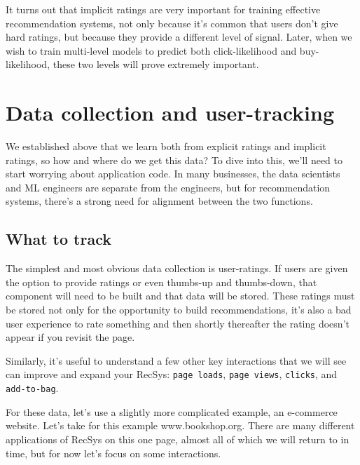 It turns out that implicit ratings are very important for training effective recommendation systems, not only because it's common that users don't give hard ratings, but because they provide a different level of signal. Later, when we wish to train multi-level models to predict both click-likelihood and buy-likelihood, these two levels will prove extremely important.

\section{Data collection and user-tracking}

We established above that we learn both from explicit ratings and implicit ratings, so how and where do we get this data? To dive into this, we'll need to start worrying about application code. In many businesses, the data scientists and ML engineers are separate from the engineers, but for recommendation systems, there's a strong need for alignment between the two functions.

\subsection{What to track}

The simplest and most obvious data collection is user-ratings. If users are given the option to provide ratings or even thumbs-up and thumbs-down, that component will need to be built and that data will be stored. These ratings must be stored not only for the opportunity to build recommendations, it's also a bad user experience to rate something and then shortly thereafter the rating doesn't appear if you revisit the page.

Similarly, it's useful to understand a few other key interactions that we will see can improve and expand your RecSys: \lstinline{page loads}, \lstinline{page views}, \lstinline{clicks}, and \lstinline{add-to-bag}.

For these data, let's use a slightly more complicated example, an e-commerce website. Let's take for this example www.bookshop.org. There are many different applications of RecSys on this one page, almost all of which we will return to in time, but for now let's focus on some interactions.

